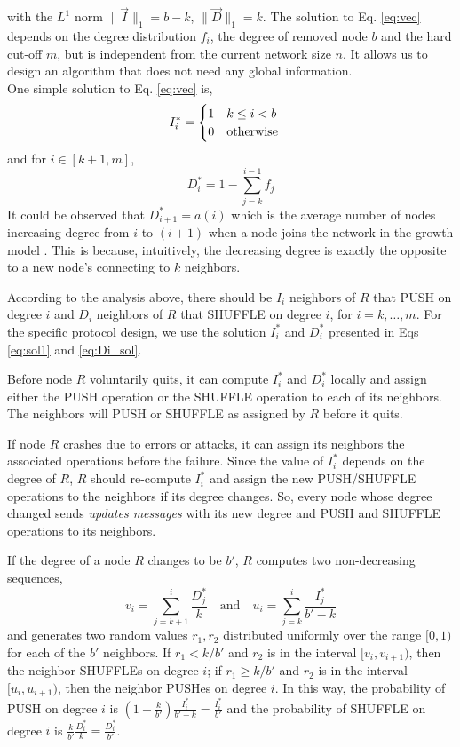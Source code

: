 with the $L^1$ norm $\|\vec{I}\|_1 = b - k$, $\| \vec{D} \|_1 = k$. The solution to Eq. \ref{eq:vec} depends on the degree distribution $f_i$, the degree of removed node $b$ and the hard cut-off $m$, but is independent from the current network size $n$. It allows us to design an algorithm that does not need any global information.\\
One simple solution to Eq. \ref{eq:vec} is,
\begin{align} \label{eq:sol1}
I_i^* &=  \begin{cases}
1 &\text{$ k \leq i < b$}\\
0 &\text{otherwise}
\end{cases}
\end{align}
and for $i \in [k+1, m]$,
\begin{equation} \label{eq:Di_sol}
D_i^* = 1 - \sum_{j=k}^{i-1} f_j
\end{equation}
It could be observed that $D_{i+1}^* = a(i)$ which is the average number of nodes increasing degree from $i$ to $(i+1)$ when a node joins the network in the growth model \cite{bulut2014constructing}. This is because, intuitively, the decreasing degree is exactly the opposite to a new node's connecting to $k$ neighbors.

According to the analysis above, there should be $I_i$ neighbors of $R$ that PUSH on degree $i$ and $D_i$ neighbors of $R$ that SHUFFLE on degree $i$, for $i=k,\ldots,m$. For the specific protocol design, we use the solution $I_i^*$ and $D_i^*$ presented in Eqs \ref{eq:sol1} and \ref{eq:Di_sol}.

Before node $R$ voluntarily quits, it can compute $I_i^*$ and $D_i^*$ locally and assign either the PUSH operation or the SHUFFLE operation to each of its neighbors. The neighbors will PUSH or SHUFFLE as assigned by $R$ before it quits.

If node $R$ crashes due to errors or attacks, it can assign its neighbors the associated operations before the failure. Since the value of $I_i^*$ depends on the degree of $R$, $R$ should re-compute $I_i^*$ and assign the new PUSH/SHUFFLE operations to the neighbors if its degree changes. So, every node whose degree changed sends \textit{updates messages} with its new degree and PUSH and SHUFFLE operations to its neighbors.

If the degree of a node $R$ changes to be $b'$, $R$ computes two non-decreasing sequences,
\begin{equation} \label{eq:uandv}
    v_i = \sum_{j=k+1}^{i} \frac{D_j^*}{k} \quad \textrm{and} \quad
    u_i = \sum_{j=k}^{i} \frac{I_j^*}{b'-k}
\end{equation}
and generates two random values $r_1, r_2$ distributed uniformly over the range $[0, 1)$ for each of the $b'$ neighbors. If $r_1 < k/b' $ and $r_2$ is in the interval $[v_i, v_{i+1})$, then the neighbor SHUFFLEs on degree $i$; if $r_1 \geq k/b' $ and $r_2$ is in the interval $[u_i, u_{i+1})$, then the neighbor PUSHes on degree $i$. In this way, the probability of PUSH on degree $i$ is $(1-\frac{k}{b'}) \frac{I_i^*}{b'-k} = \frac{I_i^*}{b'}$ and the probability of SHUFFLE on degree $i$ is $ \frac{k}{b'} \frac{D_i^*}{k} = \frac{D_i^*}{b'}$.

